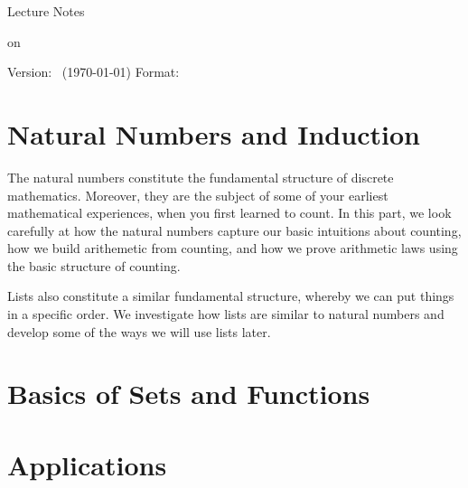 \documentclass[10pt,twosided,openany]{memoir}
\newlength\drop
\newcommand*{\mytitle}{
	\begingroup%
		\drop=0.1\textheight
		\fboxsep 0.5\baselineskip
		\sffamily
		{\centering
			{\Large \Course}\par
			\vspace{0.3\drop}
			{\Large Lecture Notes}\par
			\vspace{0.3\drop}
			{\Large on}\par
			\vspace{0.3\drop}
			{\Large \Topic}\par
			\vspace{0.9\drop}
			{\large \Author}\par
			\vspace{0.3\drop}
			{\Date}\par
			\vspace{1\drop}
		}
		\vfill
		\vfill
	{\small Version: \Version\ (\today) Format: \format}
	\endgroup
}
\begin{document}
	
\pagestyle{empty} 
\mytitle
\clearpage
\pagestyle{simple}
\tableofcontents
\clearpage


%

\mainmatter
\part{Natural Numbers and Induction}
\begin{overview}
	The natural numbers constitute the fundamental structure of discrete mathematics. Moreover, they are the subject of some of your earliest mathematical experiences, when you first learned to count. In this part, we look carefully at how the natural numbers capture our basic intuitions about counting, how we build arithemetic from counting, and how we prove arithmetic laws using the basic structure of counting.
	
	Lists also constitute a similar fundamental structure, whereby we can put things in a specific order. We investigate how lists are similar to natural numbers and develop some of the ways we will use lists later.
\end{overview}
\newpage





\part{Basics of Sets and Functions}



\part{Applications}




%

%

%

%


\appendix


\end{document}
